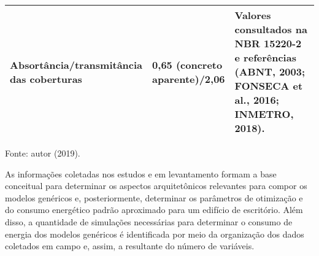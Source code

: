 \begin{table}[ht]
\begin{tabular*}{\columnwidth}{@{\extracolsep{\fill}}lll}
    \makecell[l]{Absortância/transmitância \\das coberturas}       & \makecell[l]{0,65 (concreto \\aparente)/2,06}                                         & \makecell[l]{Valores consultados na \\NBR 15220-2 e referências \\(ABNT, 2003; FONSECA et \\al., 2016; INMETRO, 2018).}                                                 \\ \hline
    \end{tabular*}
    \begin{flushleft}
        \par \small Fonte: autor (2019).
    \end{flushleft}
\end{table}\vspace*{-0.3cm}

\noindent As informações coletadas nos estudos e em levantamento formam a base conceitual para 
determinar os aspectos arquitetônicos relevantes para compor os modelos genéricos e, 
posteriormente, determinar os parâmetros de otimização e do consumo energético padrão 
aproximado para um edifício de escritório. Além disso, a quantidade de simulações necessárias 
para determinar o consumo de energia dos modelos genéricos é identificada por meio da 
organização dos dados coletados em campo e, assim, a resultante do número de variáveis.